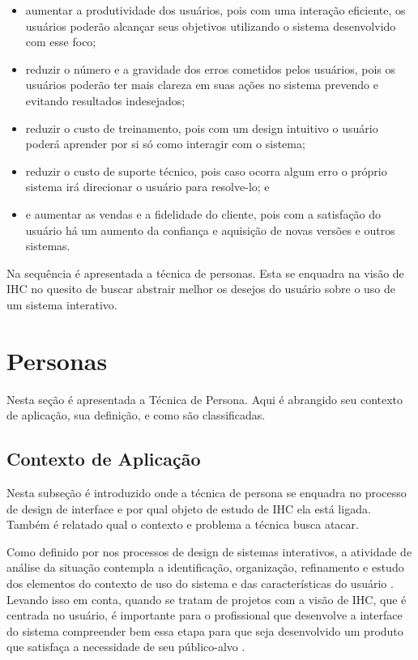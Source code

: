 \begin{itemize}
    \item aumentar a produtividade dos usuários, pois com uma interação eficiente, os usuários poderão alcançar seus objetivos utilizando o sistema desenvolvido com esse foco;

    \item reduzir o número e a gravidade dos erros cometidos pelos usuários, pois os usuários poderão ter mais clareza em suas ações no sistema prevendo e evitando resultados indesejados;

    \item reduzir o custo de treinamento, pois com um design intuitivo o usuário poderá aprender por si só como interagir com o sistema;

    \item reduzir o custo de suporte técnico, pois caso ocorra algum erro o próprio sistema irá direcionar o usuário para resolve-lo; e

    \item e aumentar as vendas e a fidelidade do cliente, pois com a satisfação do usuário há um aumento da confiança e aquisição de novas versões e outros sistemas.
\end{itemize}

Na sequência é apresentada a técnica de personas. Esta se enquadra na visão de IHC no quesito de buscar abstrair melhor os desejos do usuário sobre o uso de um sistema interativo. 

\section{Personas}

Nesta seção é apresentada a Técnica de Persona. Aqui é abrangido seu contexto de aplicação, sua definição, e como são classificadas.

\subsection{Contexto de Aplicação}

Nesta subseção é introduzido onde a técnica de persona se enquadra no processo de design de interface e por qual objeto de estudo de IHC ela está ligada. Também é relatado qual o contexto e problema a técnica busca atacar.

Como definido por  nos processos de design de sistemas interativos, a atividade de análise da situação contempla a identificação, organização, refinamento e estudo dos elementos do contexto de uso do sistema e das características do usuário \cite{hewett1992}. Levando isso em conta, quando se tratam de projetos com a visão de IHC, que é centrada no usuário, é importante para o profissional que desenvolve a interface do sistema compreender bem essa etapa para que seja desenvolvido um produto que satisfaça a necessidade de seu público-alvo \cite{barbosa_silva}. %

